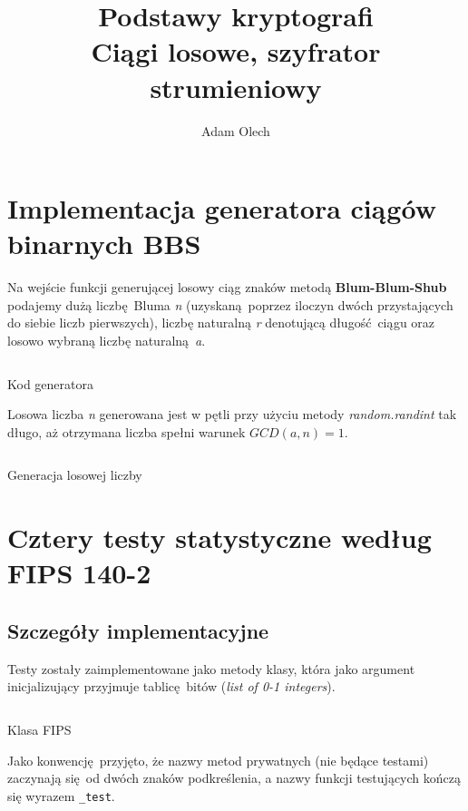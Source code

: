\documentclass[12pt]{article}
\title{Podstawy kryptografi \\ \large Ciągi losowe, szyfrator strumieniowy}
\author{Adam Olech}
\begin{document}
\maketitle

\tableofcontents
\newpage

\section{Implementacja generatora ciągów binarnych BBS}

Na wejście funkcji generującej losowy ciąg znaków metodą \textbf{Blum-Blum-Shub}
podajemy dużą liczbę Bluma \textit{n} 
(uzyskaną poprzez iloczyn dwóch przystających do siebie liczb pierwszych),
liczbę naturalną \textit{r} denotującą długość ciągu
oraz losowo wybraną liczbę naturalną \textit{a}.

\begin{listing}[H]
	\inputminted[firstline=21,lastline=32]{python}{../bbs_generator.py}
	\caption{Kod generatora}
\end{listing}

Losowa liczba \textit{n} generowana jest w pętli przy użyciu metody \textit{random.randint}
tak długo, aż otrzymana liczba spełni warunek $GCD(a,n) = 1$.

\begin{listing}[H]
	\inputminted[firstline=14,lastline=19]{python}{../bbs_generator.py}
	\caption{Generacja losowej liczby}
\end{listing}

\newpage

\section{Cztery testy statystyczne według FIPS 140-2}

\subsection{Szczegóły implementacyjne}

Testy zostały zaimplementowane jako metody klasy, która jako argument inicjalizujący przyjmuje
tablicę bitów (\textit{list of 0-1 integers}).

\begin{listing}[H]
	\inputminted[firstline=4,lastline=9]{python}{../fips.py}
	\caption{Klasa FIPS}
\end{listing}

Jako konwencję przyjęto, że nazwy metod prywatnych (nie będące testami) zaczynają się od dwóch znaków podkreślenia,
a nazwy funkcji testujących kończą się wyrazem \lstinline{_test}.
\end{document}
